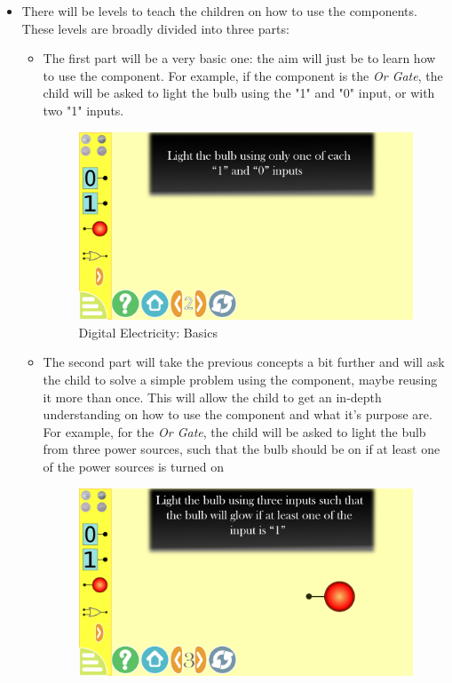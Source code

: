 \documentclass[preprint,12pt]{elsarticle}
\begin{document}
\begin{itemize}
\item There will be levels to teach the children on how to use the components. These levels are broadly divided into three parts:
\begin{itemize}
\item The first part will be a very basic one: the aim will just be to learn how to use the component. For example, if the component is the \textit{Or Gate}, the child will be asked to light the bulb using the "1" and "0" input, or with two "1" inputs.
\begin{figure}[H]
\centering\includegraphics[width=1.0\linewidth]{digital_level_2}
\caption{Digital Electricity: Basics}
\end{figure}
\item The second part will take the previous concepts a bit further and will ask the child to solve a simple problem using the component, maybe reusing it more than once. This will allow the child to get an in-depth understanding on how to use the component and what it’s purpose are. For example, for the \textit{Or Gate}, the child will be asked to light the bulb from three power sources, such that the bulb should be on if at least one of the power sources is turned on
\begin{figure}[H]
\centering\includegraphics[width=1.0\linewidth]{digital_level_3}

\end{figure}
\end{itemize}
\end{itemize}
\end{document}
